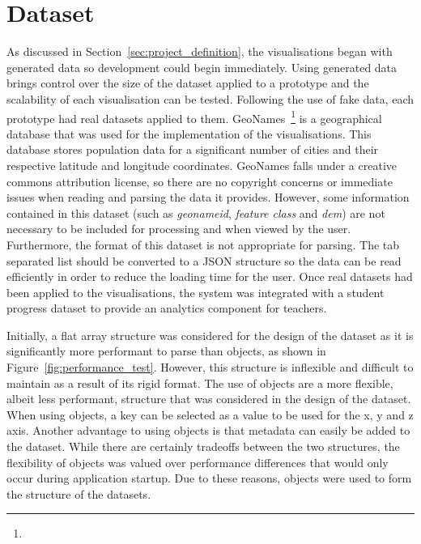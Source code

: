 \section{Dataset} {
\label{sec:dataset}

	As discussed in Section~\ref{sec:project_definition}, the visualisations began with generated data so development could begin immediately. Using generated data brings control over the size of the dataset applied to a prototype and the scalability of each visualisation can be tested. Following the use of fake data, each prototype had real datasets applied to them. GeoNames~\footnote{} is a geographical database that was used for the implementation of the visualisations. This database stores population data for a significant number of cities and their respective latitude and longitude coordinates. GeoNames falls under a creative commons attribution license, so there are no copyright concerns or immediate issues when reading and parsing the data it provides. However, some information contained in this dataset (such as \emph{geonameid}, \emph{feature class} and \emph{dem}) are not necessary to be included for processing and when viewed by the user. Furthermore, the format of this dataset is not appropriate for parsing. The tab separated list should be converted to a JSON structure so the data can be read efficiently in order to reduce the loading time for the user. Once real datasets had been applied to the visualisations, the system was integrated with a student progress dataset to provide an analytics component for teachers.

	Initially, a flat array structure was considered for the design of the dataset as it is significantly more performant to parse than objects, as shown in Figure~\ref{fig:performance_test}. However, this structure is inflexible and difficult to maintain as a result of its rigid format. The use of objects are a more flexible, albeit less performant, structure that was considered in the design of the dataset. When using objects, a key can be selected as a value to be used for the x, y and z axis. Another advantage to using objects is that metadata can easily be added to the dataset. While there are certainly tradeoffs between the two structures, the flexibility of objects was valued over performance differences that would only occur during application startup. Due to these reasons, objects were used to form the structure of the datasets.

	

}

